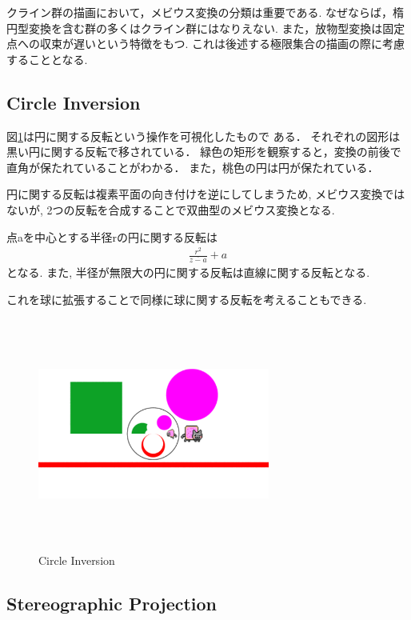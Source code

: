 クライン群の描画において，メビウス変換の分類は重要である.
なぜならば，楕円型変換を含む群の多くはクライン群にはなりえない.
また，放物型変換は固定点への収束が遅いという特徴をもつ.
これは後述する極限集合の描画の際に考慮することとなる.

\subsection{Circle Inversion}

図\ref{fig:circleInversion}は円に関する反転という操作を可視化したもので
ある．
それぞれの図形は黒い円に関する反転で移されている．
緑色の矩形を観察すると，変換の前後で直角が保たれていることがわかる．
また，桃色の円は円が保たれている．

円に関する反転は複素平面の向き付けを逆にしてしまうため, メビウス変換では
ないが, 2つの反転を合成することで双曲型のメビウス変換となる.

点aを中心とする半径rの円に関する反転は
\begin{align*}
 \frac{r^2}{\overline{z - a}} + a
\end{align*}
となる.
また, 半径が無限大の円に関する反転は直線に関する反転となる.

これを球に拡張することで同様に球に関する反転を考えることもできる.

\begin{figure}[htbp]
 \begin{center}
      \includegraphics[width=3in, height=3in, keepaspectratio]{../img/klein/circleInversion.pdf}
    \caption{Circle Inversion}
    \label{fig:circleInversion}
 \end{center}
\end{figure}

\subsection{Stereographic Projection}

